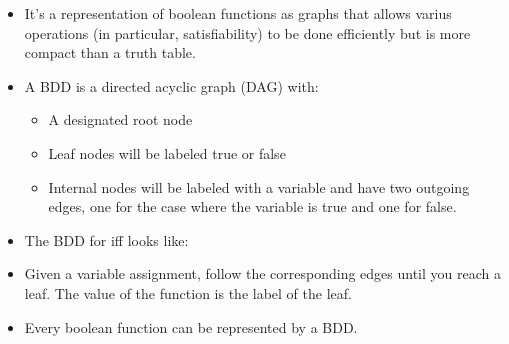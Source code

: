 \documentclass{article}
\begin{document}
\begin{itemize}
\item It's a representation of boolean functions as graphs that allows varius operations (in particular, satisfiability) to be done efficiently but is more compact than a truth table.
\item A BDD is a directed acyclic graph (DAG) with: \begin{itemize}
    \item A designated root node
    \item Leaf nodes will be labeled true or false
    \item Internal nodes will be labeled with a variable and have two outgoing edges, one for the case where the variable is true and one for false.
\end{itemize}
\item The BDD for iff looks like:
\begin{center}
\end{center}
\item Given a variable assignment, follow the corresponding edges until you reach a leaf. The value of the function is the label of the leaf.
\item Every boolean function can be represented by a BDD.
\end{itemize}
\end{document}
